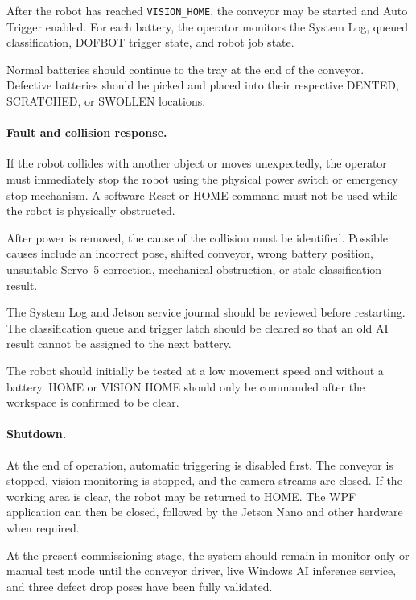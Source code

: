 After the robot has reached \texttt{VISION\_HOME}, the conveyor may be started and Auto Trigger enabled. For each battery, the operator monitors the System Log, queued classification, DOFBOT trigger state, and robot job state.

Normal batteries should continue to the tray at the end of the conveyor. Defective batteries should be picked and placed into their respective DENTED, SCRATCHED, or SWOLLEN locations.

\paragraph{Fault and collision response.}
If the robot collides with another object or moves unexpectedly, the operator must immediately stop the robot using the physical power switch or emergency stop mechanism. A software Reset or HOME command must not be used while the robot is physically obstructed.

After power is removed, the cause of the collision must be identified. Possible causes include an incorrect pose, shifted conveyor, wrong battery position, unsuitable Servo~5 correction, mechanical obstruction, or stale classification result.

The System Log and Jetson service journal should be reviewed before restarting. The classification queue and trigger latch should be cleared so that an old AI result cannot be assigned to the next battery.

The robot should initially be tested at a low movement speed and without a battery. HOME or VISION HOME should only be commanded after the workspace is confirmed to be clear.

\paragraph{Shutdown.}
At the end of operation, automatic triggering is disabled first. The conveyor is stopped, vision monitoring is stopped, and the camera streams are closed. If the working area is clear, the robot may be returned to HOME. The WPF application can then be closed, followed by the Jetson Nano and other hardware when required.

At the present commissioning stage, the system should remain in monitor-only or manual test mode until the conveyor driver, live Windows AI inference service, and three defect drop poses have been fully validated.
